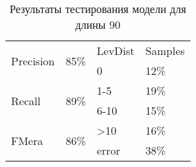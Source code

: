 \begin{table}[h]
\centering
\begin{tabular}{|p{2cm}|p{2cm}||p{2cm}|p{2cm}|}
\hline
\multirow{2}{*}{Precision} & \multirow{2}{*}{85\%} & LevDist & Samples \\ \cline{3-4} 
 &  & 0 & 12\% \\ \hline
\multirow{2}{*}{Recall} & \multirow{2}{*}{89\%} & 1-5 & 19\% \\ \cline{3-4} 
 &  & 6-10 & 15\% \\ \hline
\multirow{2}{*}{FMera} & \multirow{2}{*}{86\%} & \textgreater{}10 & 16\% \\ \cline{3-4} 
 &  & error & 38\% \\ \hline
\end{tabular}
\caption{Результаты тестирования модели для длины 90}
\label{table1}
\end{table}